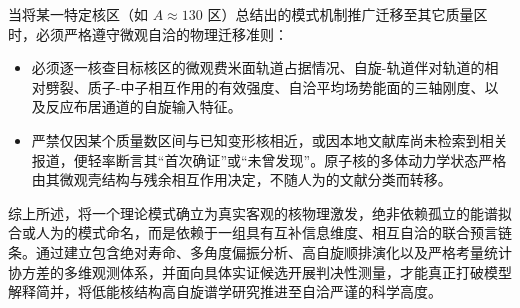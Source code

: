 当将某一特定核区（如 $A \approx 130$ 区）总结出的模式机制推广迁移至其它质量区时，必须严格遵守微观自洽的物理迁移准则：
\begin{itemize}
\item 必须逐一核查目标核区的微观费米面轨道占据情况、自旋-轨道伴对轨道的相对劈裂、质子-中子相互作用的有效强度、自洽平均场势能面的三轴刚度、以及反应布居通道的自旋输入特征。
\item 严禁仅因某个质量数区间与已知变形核相近，或因本地文献库尚未检索到相关报道，便轻率断言其“首次确证”或“未曾发现”。原子核的多体动力学状态严格由其微观壳结构与残余相互作用决定，不随人为的文献分类而转移。
\end{itemize}

综上所述，将一个理论模式确立为真实客观的核物理激发，绝非依赖孤立的能谱拟合或人为的模式命名，而是依赖于一组具有互补信息维度、相互自洽的联合预言链条。通过建立包含绝对寿命、多角度偏振分析、高自旋顺排演化以及严格考量统计协方差的多维观测体系，并面向具体实证候选开展判决性测量，才能真正打破模型解释简并，将低能核结构高自旋谱学研究推进至自洽严谨的科学高度。

